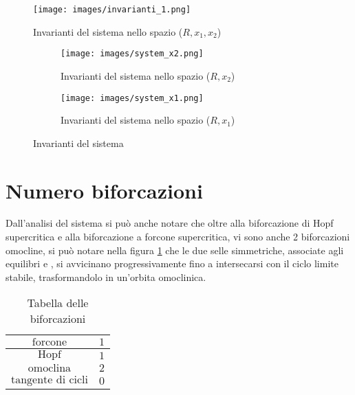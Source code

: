 \documentclass{article}
\newcommand{\rom}[1]{\uppercase\expandafter{\romannumeral #1\relax}}
\begin{document}
\begin{figure}
    \centering
    \texttt{[image: images/invarianti\_1.png]}
    \caption{Invarianti del sistema nello spazio (\(R, x_1, x_2\))}
    \label{fig:invarianti}
\end{figure}

\begin{figure}
    \centering
    \begin{subfigure}{0.45\textwidth}
        \texttt{[image: images/system\_x2.png]}
        \caption{Invarianti del sistema nello spazio (\(R, x_2\))}
        \label{fig:sistema_x2}
    \end{subfigure}
    \hfill
    \begin{subfigure}{0.45\textwidth}
        \texttt{[image: images/system\_x1.png]}
        \caption{Invarianti del sistema nello spazio (\(R, x_1\))}
        \label{fig:sistema_x1}
    \end{subfigure}
    \caption{Invarianti del sistema}
    \label{fig:sistema_grafo}
\end{figure}

\newpage

\section{Numero biforcazioni}

Dall'analisi del sistema si può anche notare che oltre alla biforcazione di Hopf supercritica e alla biforcazione a forcone supercritica, vi sono anche 2 biforcazioni omocline, si può notare nella figura \ref{fig:invarianti} che le due selle simmetriche, associate agli equilibri \rom{2} e \rom{3}, si avvicinano progressivamente fino a intersecarsi con il ciclo limite stabile, trasformandolo in un'orbita omoclinica.

\begin{table}[h!]
    \centering
    \begin{tabular}{|c|c|}
        \hline
        $\text{forcone}$           & $1$ \\ \hline
        $\text{Hopf}$              & $1$ \\ \hline
        $\text{omoclina}$          & $2$ \\ \hline
        $\text{tangente di cicli}$ & $0$ \\ \hline
    \end{tabular}
    \caption{Tabella delle biforcazioni}
\end{table}
\end{document}
